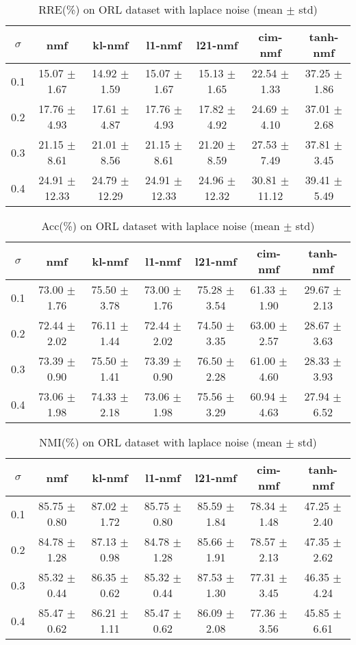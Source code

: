 \documentclass{article} %
\begin{document}
\begin{table}[H]
\begin{tabular}{c|cccccc}$\sigma$ & nmf & kl-nmf & l1-nmf & l21-nmf & cim-nmf & tanh-nmf \\\hline
0.1 & 15.07 $\pm$ 1.67 & 14.92 $\pm$ 1.59 & 15.07 $\pm$ 1.67 & 15.13 $\pm$ 1.65 & 22.54 $\pm$ 1.33 & 37.25 $\pm$ 1.86 \\
0.2 & 17.76 $\pm$ 4.93 & 17.61 $\pm$ 4.87 & 17.76 $\pm$ 4.93 & 17.82 $\pm$ 4.92 & 24.69 $\pm$ 4.10 & 37.01 $\pm$ 2.68 \\
0.3 & 21.15 $\pm$ 8.61 & 21.01 $\pm$ 8.56 & 21.15 $\pm$ 8.61 & 21.20 $\pm$ 8.59 & 27.53 $\pm$ 7.49 & 37.81 $\pm$ 3.45 \\
0.4 & 24.91 $\pm$ 12.33 & 24.79 $\pm$ 12.29 & 24.91 $\pm$ 12.33 & 24.96 $\pm$ 12.32 & 30.81 $\pm$ 11.12 & 39.41 $\pm$ 5.49 \\
\end{tabular}\caption{
  RRE(\%) on ORL dataset with laplace noise (mean $\pm$ std)
  \label{tab:RRE-ORL-laplace}
}\end{table}
\begin{table}[H]
\begin{tabular}{c|cccccc}$\sigma$ & nmf & kl-nmf & l1-nmf & l21-nmf & cim-nmf & tanh-nmf \\\hline
0.1 & 73.00 $\pm$ 1.76 & 75.50 $\pm$ 3.78 & 73.00 $\pm$ 1.76 & 75.28 $\pm$ 3.54 & 61.33 $\pm$ 1.90 & 29.67 $\pm$ 2.13 \\
0.2 & 72.44 $\pm$ 2.02 & 76.11 $\pm$ 1.44 & 72.44 $\pm$ 2.02 & 74.50 $\pm$ 3.35 & 63.00 $\pm$ 2.57 & 28.67 $\pm$ 3.63 \\
0.3 & 73.39 $\pm$ 0.90 & 75.50 $\pm$ 1.41 & 73.39 $\pm$ 0.90 & 76.50 $\pm$ 2.28 & 61.00 $\pm$ 4.60 & 28.33 $\pm$ 3.93 \\
0.4 & 73.06 $\pm$ 1.98 & 74.33 $\pm$ 2.18 & 73.06 $\pm$ 1.98 & 75.56 $\pm$ 3.29 & 60.94 $\pm$ 4.63 & 27.94 $\pm$ 6.52 \\
\end{tabular}\caption{
  Acc(\%) on ORL dataset with laplace noise (mean $\pm$ std)
  \label{tab:Acc-ORL-laplace}
}\end{table}
\begin{table}[H]
\begin{tabular}{c|cccccc}$\sigma$ & nmf & kl-nmf & l1-nmf & l21-nmf & cim-nmf & tanh-nmf \\\hline
0.1 & 85.75 $\pm$ 0.80 & 87.02 $\pm$ 1.72 & 85.75 $\pm$ 0.80 & 85.59 $\pm$ 1.84 & 78.34 $\pm$ 1.48 & 47.25 $\pm$ 2.40 \\
0.2 & 84.78 $\pm$ 1.28 & 87.13 $\pm$ 0.98 & 84.78 $\pm$ 1.28 & 85.66 $\pm$ 1.91 & 78.57 $\pm$ 2.13 & 47.35 $\pm$ 2.62 \\
0.3 & 85.32 $\pm$ 0.44 & 86.35 $\pm$ 0.62 & 85.32 $\pm$ 0.44 & 87.53 $\pm$ 1.30 & 77.31 $\pm$ 3.45 & 46.35 $\pm$ 4.24 \\
0.4 & 85.47 $\pm$ 0.62 & 86.21 $\pm$ 1.11 & 85.47 $\pm$ 0.62 & 86.09 $\pm$ 2.08 & 77.36 $\pm$ 3.56 & 45.85 $\pm$ 6.61 \\
\end{tabular}\caption{
  NMI(\%) on ORL dataset with laplace noise (mean $\pm$ std)
  \label{tab:NMI-ORL-laplace}
}\end{table}
\end{document}
